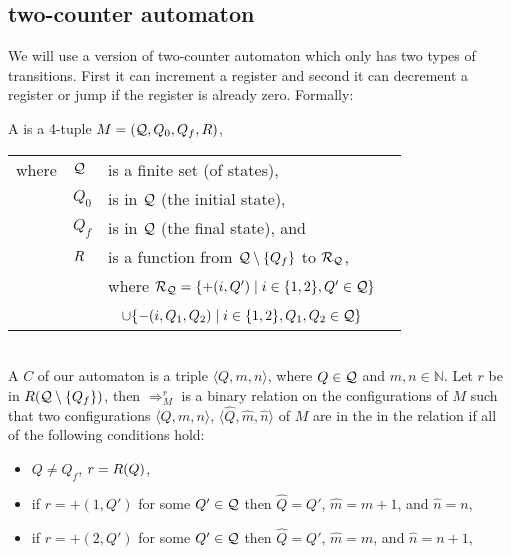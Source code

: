 \subsection{two-counter automaton} %
We will use a version of two-counter automaton which only has two types of transitions. First it can increment a register and second it can decrement a register or jump if the register is already zero. Formally:
\begin{definition}
	A  is a 4-tuple $M=(\mathcal{Q},Q_0,Q_f,R)$,
	\begin{tabular}{llp{0.78\linewidth}}
		where & $\mathcal{Q}$ & is a finite set (of states),                                                                           \\
& $Q_0$        & is in $\mathcal{Q}$ (the initial state),                                                                \\
& $Q_f$        & is in $\mathcal{Q}$ (the final state), and                                                              \\
& $R$  & is a function from $\mathcal{Q}\setminus\{Q_f\}$ to $\mathcal{R}_\autStates$,                           \\
&              & where $\mathcal{R}_{\mathcal{Q}}=\{+(i,Q')\mid i\in\{1,2\},Q'\in\mathcal{Q}\}$                             \\
&              & ~ \hphantom{where $\mathcal{R}_\autStates$}$\cup\{-(i,Q_1,Q_2)\mid i\in\{1,2\},Q_1,Q_2\in\mathcal{Q}\}$ 
	\end{tabular}\\
	A  $C$ of our automaton is a triple $\langle Q,m,n\rangle$, where $Q\in\mathcal{Q}$ and $m,n\in\mathbb{N}$.
	Let $r$ be in $R(\mathcal{Q}\setminus\{Q_f\})$, then $\Rightarrow^r_M$ is a binary relation on the configurations of $M$ such that two configurations $\langle Q,m,n\rangle$, $\langle \widehat{Q},\widehat{m},\widehat{n}\rangle$ of $M$ are in the in the relation if all of the following conditions hold:
	\begin{itemize}
		\item $Q\neq Q_f$, $r=R(Q)$,
		\item if $r=+(1,Q')$ for some $Q'\in \mathcal{Q}$ then $\widehat{Q}=Q'$, $\widehat{m}=m+1$, and $\widehat{n}=n$,
		\item if $r=+(2,Q')$ for some $Q'\in \mathcal{Q}$ then $\widehat{Q}=Q'$, $\widehat{m}=m$, and $\widehat{n}=n+1$,

\end{itemize}
\end{definition}
